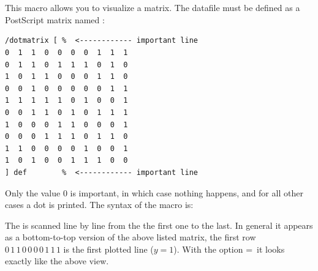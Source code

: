 \documentclass[11pt,english,BCOR=10mm,DIV=12,bibliography=totoc,parskip=false,headings=small,
    headinclude=false,footinclude=false,oneside]{pst-doc}
\begin{document}


\clearpage
\section{}\label{sec:psMatrix}

This macro allows you to visualize a matrix. The datafile must be
defined as a PostScript matrix named :
\begin{lstlisting}[style=syntax]
/dotmatrix [ %  <------------ important line
0  1  1  0  0  0  0  1  1  1
0  1  1  0  1  1  1  0  1  0
1  0  1  1  0  0  0  1  1  0
0  0  1  0  0  0  0  0  1  1
1  1  1  1  1  0  1  0  0  1
0  0  1  1  0  1  0  1  1  1
1  0  0  0  1  1  0  0  0  1
0  0  0  1  1  1  0  1  1  0
1  1  0  0  0  0  1  0  0  1
1  0  1  0  0  1  1  1  0  0
] def        %  <------------ important line
\end{lstlisting}

Only the value 0 is important, in which case nothing happens, and
for all other cases a dot is printed. The syntax of the macro is:

\begin{BDef}
\OptArgs{}
\end{BDef}

The  is scanned line by line from the the first one to the
last. In general it appears as a bottom-to-top version of the
above listed matrix, the first row $0\,1\,1\,0\,0\,0\,0\,1\,1\,1$
is the first plotted line ($y=1$). With the option
=\true\ it looks exactly like the above view.

\bgroup
\begin{center}
\quad
{}
\end{center}
\end{document}
